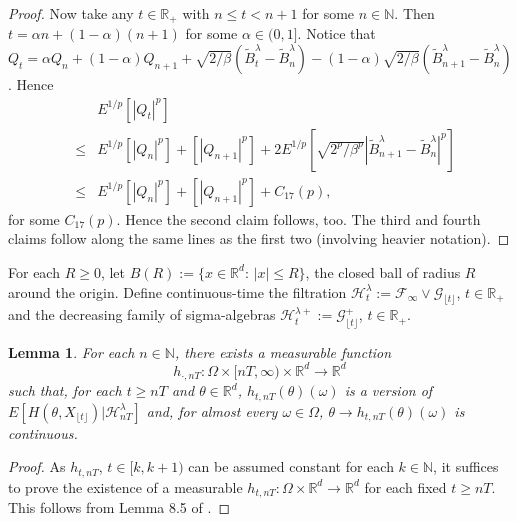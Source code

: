 \documentclass[a4paper,draft]{article}
\newtheorem{lemma}[theorem]{Lemma}
\begin{document}
\begin{proof}
Now take any $t\in\mathbb{R}_+$ with $n\leq t<n+1$ for some $n\in\mathbb{N}$.
Then $t=\alpha n+(1-\alpha)(n+1)$ for some $\alpha\in (0,1]$.
Notice that $Q_t=\alpha Q_n +(1-\alpha)Q_{n+1}+\sqrt{2/\beta}(\tilde{B}^{\lambda}_{t}-\tilde{B}^{\lambda}_n)-
(1-\alpha)\sqrt{2/\beta}(\tilde{B}^{\lambda}_{n+1}-\tilde{B}^{\lambda}_n)$.
Hence 
\begin{eqnarray*}
& & E^{1/p}[|Q_t|^p]\\
&\leq&  E^{1/p}[|Q_n|^p]+[|Q_{n+1}|^p]+2E^{1/p}[\sqrt{2^p/\beta^p}|\tilde{B}^{\lambda}_{n+1}-\tilde{B}^{\lambda}_n|^p]\\
&\leq& E^{1/p}[|Q_n|^p]+[|Q_{n+1}|^p]+C_{17}(p),
\end{eqnarray*}
for some $C_{17}(p)$. Hence the second claim follows, too. The third and fourth claims
follow along the same lines as the first two (involving heavier notation).
\end{proof}

For each $R\geq 0$, let $B(R):=\{x\in\mathbb{R}^d:\, |x|\leq R\}$, the closed
ball of radius $R$ around the origin.
Define continuous-time the filtration
$\mathcal{H}_t^{\lambda}:=\mathcal{F}_{\infty}\vee \mathcal{G}_{\lfloor t\rfloor}$, $t\in\mathbb{R}_+$ and
the decreasing family of sigma-algebras 
$\mathcal{H}_t^{\lambda+}:=\mathcal{G}^+_{\lfloor t\rfloor}$, $t\in\mathbb{R}_+$.


\begin{lemma}\label{haa} For each
$n\in\mathbb{N}$,
there exists a measurable function 
$$
h_{\cdot,nT}:\Omega\times [nT,\infty)\times
\mathbb{R}^d\to\mathbb{R}^d
$$
such that, for each $t\geq nT$ and $\theta\in\mathbb{R}^d$, $h_{t,nT}(\theta)(\omega)$
is a version of $E[H(\theta,X_{\lfloor t\rfloor})\vert \mathcal{H}_{nT}^{\lambda}]$ and,
for almost every $\omega\in\Omega$, $\theta\to h_{t,nT}(\theta)(\omega)$ is continuous.
\end{lemma}
\begin{proof}
As $h_{t,nT}$, $t\in [k,k+1)$ can be assumed constant
for each $k\in\mathbb{N}$, it suffices to prove the existence of a measurable
$h_{t,nT}:\Omega\times\mathbb{R}^d\to\mathbb{R}^d$ for each fixed $t\geq nT$. 
This follows from Lemma 8.5 of \cite{convex}.
\end{proof}
\end{document}

